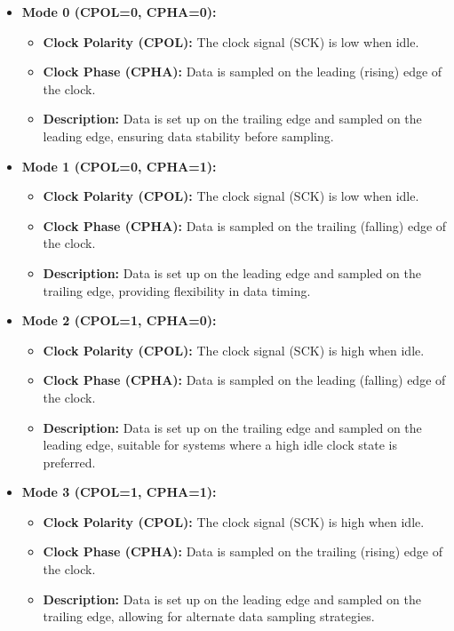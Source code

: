 \begin{itemize}
    \item \textbf{Mode 0 (CPOL=0, CPHA=0):} 
    \begin{itemize}
        \item \textbf{Clock Polarity (CPOL):} The clock signal (SCK) is low when idle.
        \item \textbf{Clock Phase (CPHA):} Data is sampled on the leading (rising) edge of the clock.
        \item \textbf{Description:} Data is set up on the trailing edge and sampled on the leading edge, ensuring data stability before sampling.
    \end{itemize}
     
    \item \textbf{Mode 1 (CPOL=0, CPHA=1):}
    \begin{itemize}
        \item \textbf{Clock Polarity (CPOL):} The clock signal (SCK) is low when idle.
        \item \textbf{Clock Phase (CPHA):} Data is sampled on the trailing (falling) edge of the clock.
        \item \textbf{Description:} Data is set up on the leading edge and sampled on the trailing edge, providing flexibility in data timing.
    \end{itemize}
    
    \item \textbf{Mode 2 (CPOL=1, CPHA=0):}
    \begin{itemize}
        \item \textbf{Clock Polarity (CPOL):} The clock signal (SCK) is high when idle.
        \item \textbf{Clock Phase (CPHA):} Data is sampled on the leading (falling) edge of the clock.
        \item \textbf{Description:} Data is set up on the trailing edge and sampled on the leading edge, suitable for systems where a high idle clock state is preferred.
    \end{itemize}
    
    \item \textbf{Mode 3 (CPOL=1, CPHA=1):}
    \begin{itemize}
        \item \textbf{Clock Polarity (CPOL):} The clock signal (SCK) is high when idle.
        \item \textbf{Clock Phase (CPHA):} Data is sampled on the trailing (rising) edge of the clock.
        \item \textbf{Description:} Data is set up on the leading edge and sampled on the trailing edge, allowing for alternate data sampling strategies.
    \end{itemize}
\end{itemize}

